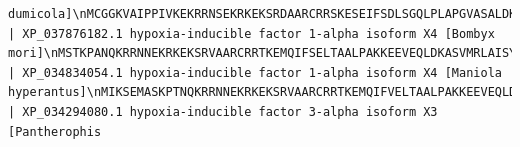 \documentclass[
  letterpaper,
  DIV=11,
  numbers=noendperiod]{scrartcl}
\begin{document}
\begin{verbatim}
dumicola]\nMCGGKVAIPPIVKEKRRNSEKRKEKSRDAARCRRSKESEIFSDLSGQLPLAPGVASALDKASIMRLTVGYLKVREMMKIL\nIPCGRTVTGSSNDSIYAAVLNGFLLVLSEEGDIIYLSENVEEFIGISQVDMMGHSVYDFSHPCDHEDIKQVLAPKISEKI\nQIKTDNFGRETISFFVRMKSTVKSKGRTMNLKSAAYQVIHYIGHRFDKPRGVEDDDKCPTFYLVFIGKTIPHPAQIDVPL\nDKDIFVSRHSPDMKFTHIDERISEFLGFTNSELIGQSAYSFHHPLDAQTVFSAFKTLFSKGQCETGYYRFLSKYGGYVWL\nVTQATVIYENGTKPECVVCLNYVLSKVENGHEIVSGQQEQSIKEKEEAEDENICVAEEEGSPSEPPVLLSSTRVIFAPKE\nSVMSKDFLNFPDADLQDLDLEPPLEKIPCSVVNSATLNQNVLFQESLKDTKLNLEFDFFQDDPCTLENGISEDPFISYRD\nDSLSSPSYCGTPESSLNLHTSNSTSPDRFNTTPGTPDSGSLSDIPSLDPIDEFSNLDLKFTMPPSASDDSECCDENLDFR\nAPYISMNMDDDFPLISPSSSVMWGPQEPAPKKLPQERLPEIEPQRISPPKQKPVTENLNSSLAALLQSDVKKTPQSKQEK\nNAVARRESNSHKRWSGSSADNNKSSSLKQRPFNPSKGYGNGGHIIMLDSIPVKKQNSKSNASQRRTAQPSASDRRSNSPP\nFGSHTATVKVNDRLIKVQVSVSELPTSPIEHKQPFPSPPDPPPKRTSPSRLGPTESPKRLKVDNGLICSGPQGFASDSVL\nLNLLISGEDASRGYLCSGNSRYSDSKFESAMLSLSSDDSSSKQTNDSSSNCTELLASESELLDFLKISQYDAEVNAPIQS\nSHLLQGDDLLSALDHQPLLRNVPALV\n\n>Domestic_Silk_Moth | XP_037876182.1 hypoxia-inducible factor 1-alpha isoform X4 [Bombyx mori]\nMSTKPANQKRRNNEKRKEKSRVAARCRRTKEMQIFSELTAALPAKKEEVEQLDKASVMRLAISYLRVRDVVSMLPDVNSD\nQSKMQNPEGFEELASELSYMRALDGFVLVLSQQGDIVYCSDNIAEHLGVSQMEIMGQSVFEFSHPCDHDEIREALRTNGG\nARRDLLLRLKCTLTSKGRNVHLKSASYKVIHITGHMLASTEDNERNNNETKADEEKKGKAGCLVAVGRPIPHPSNIEIPL\nDSKTFLSKHSLDMKFTYVDESLLNTLGFGSEELVGRSLYDYHHAADSASMIQQFKSLFSKGQCETGQYRFLAKSGGYSWV\nQTQATVITDKQQKPISVVCVNYIISGIECKDEVFAAHQVQHADLKPKLPAVASPGVSFRAPVEPLANGAIVAIVPPEEER\nPIPVTELIFAPRKKEMNKGFLMFSQDEGLTSEWLFNQSLVLKDEPEDLTHLAPTAGDACIPLENSPFDMFDEFILSDNYC\nSLLGDDLANGSPVDPLAPDPSLLSSPESQENDSSCEQSSLLTELSLDAFDNTRSDEIDDSNSPFIPISDELPVLEPAVMW\nGALPDSVSQARPQPSETHTSPAPALQRLLTGPPPQDLITSIYSDQGLMPSRSISTWDTGVKRVMKEEEEPSAKRVKRSPS\nPVAPKPKSQSSSVLMNLLDIPQQSTPHKQPMKANYQILPNTQMLGLQNVLHRNMQVPIINITQAVPNKHVMRASTPINQM\nRTNMTTGPMSPLSLNIGSPMYSLPSSPNSYSSPAMSPAQRERVMSPYSTPQSLSPVGKFHQMYSPGQRMVSPTGVIQGSD\nPYLTTKMQPSPGFPMQVNDILLDTNVQLPTSDFWADPEFLQGTSDLLTAFDDVKLG\n\n>Ringlet_Butterfly | XP_034834054.1 hypoxia-inducible factor 1-alpha isoform X4 [Maniola hyperantus]\nMIKSEMASKPTNQKRRNNEKRKEKSRVAARCRRTKEMQIFVELTAALPAKKEEVEQLDKASVMRLAISYLRVRDVVSMLP\nEDKEAPKLQSPKGLEEVQSELSYMNALDGFVLVLSQQGDIVYCSENIADHLGVSQMEIMGQSVFEFSHPCDHDEIRESLR\nAGNDGRRDLLLRLKCTLTSKGRNVHLKSASYKVIHVTGHMITPTEEKTKDQDLSTDSDEEKKEVKSYTNTGALVAVGRPI\nPHPSNIETPLNSMTFLTKHSLDMKFTYTDEGLTNSLGFESEELVGRSLYEYHHAADSASLAQQFKSLFSKGQCETGQYRF\nLAKTGGYSWVQTQATVITDKQQKPISVICVNYVISGIECKDEVFAAHQVHHADLKPVVAPAPLIRVSTEPPANGAIVGIV\nAPEEERPIPVTEQIFVPRKKEMNKGFLMFSQNEGLTSESHSNCKSLVLKDEPEDLTHLAPTAGDACISLENNSPFDMFDD\nFMLNDNYCSLLGDDLANGSPVDSLIADSLLSSPEPQETESSCEQSSLLTELSLDAFDNRSDNDIDDGNSPFIPTTDELPL\nLEPAVMWGVLPDSVSQAKPQPSEVQTSAPALQRLLAAPPTGPPPQDIITNIYSDPGLIPSRSVSSWDTGVKRVMKQEEES\nTAKRVKRSPSPAAPTARTPSSSVLMNLLDIHPQAKQQIRQQLRSNYQMSLNTPRTSPQSPVNKNLPVPVINIIRSGPNEP\nLMRANTTAPNPPMIRTSPMSPLTLNVGSPMYSLPSSPNTPNYSPAMSPAQKDRVLSPYSTPQSLSPAGSYMYSPNNKLLS\nPSGVMRGYDPYLNNKMQTSPGFPLQSDMLLDTNMPLASTDFWPDSDMLQGTSDLLTAFDDVKLV\n\n>Corn_Snake | XP_034294080.1 hypoxia-inducible factor 3-alpha isoform X3 [Pantherophis 
\end{verbatim}
\end{document}
